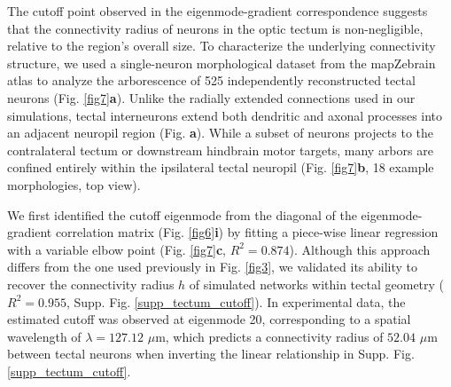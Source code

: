 \documentclass{article}
\begin{document}
The cutoff point observed in the eigenmode-gradient correspondence suggests that the connectivity radius of neurons in the optic tectum is non-negligible, relative to the region's overall size. To characterize the underlying connectivity structure, we used a single-neuron morphological dataset from the mapZebrain atlas\cite{kunst2019cellular} to analyze the arborescence of 525 independently reconstructed tectal neurons (Fig. \ref{fig7}\textbf{a}). Unlike the radially extended connections used in our simulations, tectal interneurons extend both dendritic and axonal processes into an adjacent neuropil region\cite{robles2011characterization} (Fig. \textbf{a}). While a subset of neurons projects to the contralateral tectum or downstream hindbrain motor targets\cite{helmbrecht2018topography}, many arbors are confined entirely within the ipsilateral tectal neuropil (Fig. \ref{fig7}\textbf{b}, 18 example morphologies, top view). 

We first identified the cutoff eigenmode from the diagonal of the eigenmode-gradient correlation matrix (Fig. \ref{fig6}\textbf{i}) by fitting a piece-wise linear regression with a variable elbow point (Fig. \ref{fig7}\textbf{c}, $R^2=0.874$). Although this approach differs from the one used previously in Fig. \ref{fig3}, we validated its ability to recover the connectivity radius $h$ of simulated networks within tectal geometry ($R^2=0.955$, Supp. Fig. \ref{supp_tectum_cutoff}). In experimental data, the estimated cutoff was observed at eigenmode 20, corresponding to a spatial wavelength of $\lambda=127.12$ $\mu$m, which predicts a connectivity radius of $52.04$ $\mu$m between tectal neurons when inverting the linear relationship in Supp. Fig. \ref{supp_tectum_cutoff}. 
\end{document}

